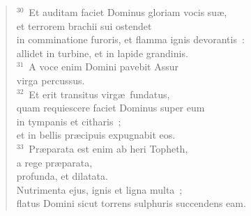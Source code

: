 \begin{flushleft}
\begin{verse}
${}^{30}$~Et auditam faciet Dominus gloriam vocis su\ae ,\\ et terrorem brachii sui ostendet\\ in comminatione furoris, et flamma ignis devorantis~:\\ allidet in turbine, et in lapide grandinis.\\
${}^{31}$~A voce enim Domini pavebit Assur\\ virga percussus.\\
${}^{32}$~Et erit transitus virg\ae\ fundatus,\\ quam requiescere faciet Dominus super eum\\ in tympanis et citharis~;\\ et in bellis pr\ae cipuis expugnabit eos.\\
${}^{33}$~Pr\ae parata est enim ab heri Topheth,\\ a rege pr\ae parata,\\ profunda, et dilatata.\\ Nutrimenta ejus, ignis et ligna multa~;\\ flatus Domini sicut torrens sulphuris succendens eam.\end{verse}\end{flushleft}


